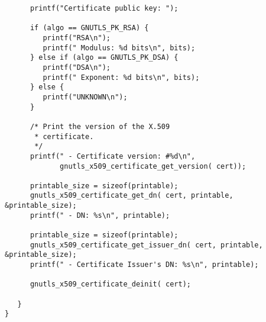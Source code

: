 \begin{verbatim}
      printf("Certificate public key: ");

      if (algo == GNUTLS_PK_RSA) {
         printf("RSA\n");
         printf(" Modulus: %d bits\n", bits);
      } else if (algo == GNUTLS_PK_DSA) {
         printf("DSA\n");
         printf(" Exponent: %d bits\n", bits);
      } else {
         printf("UNKNOWN\n");
      }

      /* Print the version of the X.509 
       * certificate.
       */
      printf(" - Certificate version: #%d\n",
             gnutls_x509_certificate_get_version( cert));

      printable_size = sizeof(printable);
      gnutls_x509_certificate_get_dn( cert, printable, &printable_size);
      printf(" - DN: %s\n", printable);

      printable_size = sizeof(printable);
      gnutls_x509_certificate_get_issuer_dn( cert, printable, &printable_size);
      printf(" - Certificate Issuer's DN: %s\n", printable);

      gnutls_x509_certificate_deinit( cert);

   }
}

\end{verbatim}

